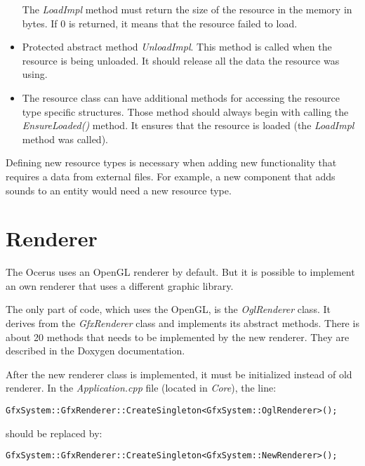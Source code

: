 \documentclass[a4paper, 12pt]{report}
\begin{document}
\begin{itemize}
The \emph{LoadImpl} method must return the size of the resource in the memory in bytes. If 0 is returned, it means that the resource failed to load.

\item
Protected abstract method \emph{UnloadImpl}. This method is called when the resource is being unloaded. It should release all the data the resource was using.

\item
The resource class can have additional methods for accessing the resource type specific structures. Those method should always begin with calling the \emph{EnsureLoaded()} method. It ensures that the resource is loaded (the \emph{LoadImpl} method was called).

\end{itemize}

Defining new resource types is necessary when adding new functionality that requires a data from external files. For example, a new component that adds sounds to an entity would need a new resource type.

\chapter{Renderer}

The Ocerus uses an OpenGL renderer by default. But it is possible to implement an own renderer that uses a different graphic library.

The only part of code, which uses the OpenGL, is the \emph{OglRenderer} class. It derives from the \emph{GfxRenderer} class and implements its abstract methods. There is about 20 methods that needs to be implemented by the new renderer. They are described in the Doxygen documentation.

After the new renderer class is implemented, it must be initialized instead of old renderer. In the \emph{Application.cpp} file (located in \emph{Core}), the line:

\begin{verbatim}
GfxSystem::GfxRenderer::CreateSingleton<GfxSystem::OglRenderer>();
\end{verbatim}
\normalsize

should be replaced by:

\begin{verbatim}
GfxSystem::GfxRenderer::CreateSingleton<GfxSystem::NewRenderer>();
\end{verbatim}
\normalsize

\end{document}
